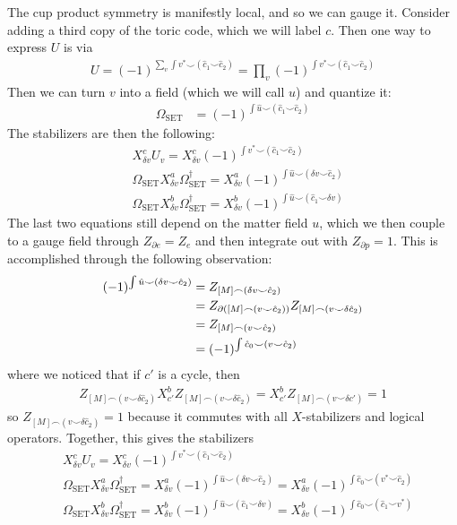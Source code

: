 \documentclass{article}
\theoremstyle{definition}
\theoremstyle{definition}
\begin{document}
The cup product symmetry is manifestly local, and so we can gauge it. Consider
adding a third copy of the toric code, which we will label $c$. Then one way to
express $U$ is via
\begin{align}
  U = (-1)^{\sum_v \int v^* \smile (\hat c_1 \smile \hat c_2)} = \prod_{v}(-1)^{\int v^* \smile (\hat c_1 \smile \hat c_2)}
\end{align}
Then we can turn $v$ into a field (which we will call $u$) and quantize it:
\begin{align}
\Omega_{\mathrm{SET}} &= (-1)^{\int \hat u \smile (\hat c_1 \smile \hat c_2)}
\end{align}
The stabilizers are then the following:
\begin{align}
  &X^c_{\delta v}U_v = X^c_{\delta v}(-1)^{\int v^* \smile (\hat c_1 \smile \hat c_2)} \\
  & \Omega_{\mathrm{SET}}X^a_{\delta v} \Omega_{\mathrm{SET}}^\dagger = X_{\delta v}^a(-1)^{\int \hat u \smile (\delta v \smile \hat c_2)} \\
  & \Omega_{\mathrm{SET}}X^b_{\delta v} \Omega_{\mathrm{SET}}^\dagger = X_{\delta v}^b(-1)^{\int \hat u \smile (\hat c_1 \smile  \delta v)}
\end{align}
The last two equations still depend on the matter field $u$, which we then
couple to a gauge field through $Z_{\partial e} = Z_{e}$ and then integrate out
with $Z_{\partial p} = 1$. This is accomplished through the following observation: 
\begin{align}
  (-1)^{\int \hat u \smile (\delta v \smile \hat c_2)} &= Z_{[M] \frown (\delta v \smile \hat c_2)} \notag \\
                                                       &= Z_{\partial([M] \frown (v \smile \hat c_2)) } Z_{[M]\frown (v \smile \delta \hat c_2)} \notag \\
                                                       &= Z_{[M] \frown (v \smile \hat c_2)} \\
  &= (-1)^{\int \hat c_0 \smile (v \smile \hat c_2)}
\end{align}
where we noticed that if $c'$ is a cycle, then
\begin{align}
Z_{[M] \frown (v \smile \delta \hat c_2)}
  X^b_{c'}Z_{[M] \frown (v \smile \delta \hat c_2)} = X^b_{c'}Z_{[M] \frown (v \smile \delta c')} = 1
\end{align}
so $Z_{[M] \frown (v \smile \delta \hat c_2)} = 1$ because it commutes with all
$X$-stabilizers and logical operators. Together, this gives the stabilizers
\begin{align}\label{eq:stabilizers-cup-product-formula}
 &X^c_{\delta v}U_v = X^c_{\delta v}(-1)^{\int v^* \smile (\hat c_1 \smile \hat c_2)} \\
  & \Omega_{\mathrm{SET}}X^a_{\delta v} \Omega_{\mathrm{SET}}^\dagger = X_{\delta v}^a(-1)^{\int \hat u \smile (\delta v \smile \hat c_2)}  = X_{\delta v}^a(-1)^{\int \hat c_0 \smile(v^* \smile \hat c_2)}\\
  & \Omega_{\mathrm{SET}}X^b_{\delta v} \Omega_{\mathrm{SET}}^\dagger = X_{\delta v}^b(-1)^{\int \hat u \smile (\hat c_1 \smile  \delta v)} = X^b_{\delta v}(-1)^{\int \hat c_0 \smile (\hat c_1 \smile  v^*)}
\end{align}
\end{document}
